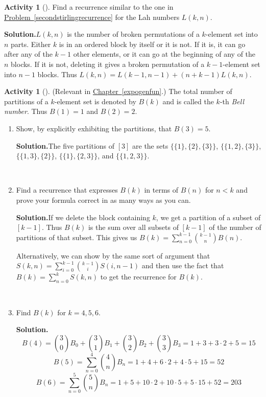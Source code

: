 \documentclass[10pt,]{book}
\theoremstyle{plain}
\theoremstyle{definition}
\newtheorem{activity}[project]{Activity}
\numberwithin{equation}{chapter}
\newcommand{\lt}{<}
\begin{document}
\begin{activity}[]\label{activity-123}
Find a recurrence similar to the one in \hyperref[secondstirlingrecurrence]{Problem~\ref{secondstirlingrecurrence}} for the Lah numbers \(L(k,n)\).%
\par\medskip\noindent%
\textbf{Solution.}\quad \(L(k,n)\) is the number of broken permutations of a \(k\)-element set into \(n\) parts. Either \(k\) is in an ordered block by itself or it is not. If it is, it can go after any of the \(k-1\) other elements, or it can go at the beginning of any of the \(n\) blocks. If it is not, deleting it gives a broken permutation of a \(k-1\)-element set into \(n-1\) blocks. Thus \(L(k,n)=L(k-1,n-1) + (n+k-1)L(k,n)\).%
\end{activity}
\begin{activity}[]\label{BellNumberIntro}
(Relevant in \hyperref[expogenfun]{Chapter~\ref{expogenfun}}.) The total number of partitions of a \(k\)-element set is denoted by \(B(k)\) and is called the \(k\)-th \emph{Bell number}. Thus \(B(1)=1\) and \(B(2) =2\).%
~\par
\begin{enumerate}[label=(\alph*)]
 \item Show, by explicitly exhibiting the partitions, that \(B(3)=5\).%
\par\medskip\noindent%
\textbf{Solution.}\quad The five partitions of \([3]\) are the sets \(\{\{1\},
\{2\},\{3\}\}\), \(\{\{1,2\},\{3\}\}\), \(\{\{1,3\},\{2\}\}\), \(\{\{1\},\{2,3\}\}\), and \(\{\{1,2,3\}\}\).%

~\par
\item Find a recurrence that expresses \(B(k)\) in terms of \(B(n)\) for \(n\lt  k\) and prove your formula correct in as many ways as you can.%
\par\medskip\noindent%
\textbf{Solution.}\quad If we delete the block containing \(k\), we get a partition of a subset of \([k-1]\). Thus \(B(k)\) is the sum over all subsets of \([k-1]\) of the number of partitions of that subset. This gives us \(B(k)= \sum_{n=0}^{k-1}\binom{k-1}{n}B(n)\).%
\par
Alternatively, we can show by the same sort of argument that \(S(k,n)=\sum_{i=0}^{k-1} \binom{k-1}{i}S(i,n-1)\) and then use the fact that \(B(k)=\sum_{n=0}^k S(k,n)\) to get the recurrence for \(B(k)\).%

~\par
\item Find \(B(k)\) for \(k=4,5,6\).%
\par\medskip\noindent%
\textbf{Solution.}\quad %
\begin{equation*}
B(4) =\binom{3}{0}B_0 +\binom{3}{1}B_1 +\binom{3}{2}B_2 +
\binom{3}{3}B_3=1 +3+3\cdot2 +5=15
\end{equation*}
%
\begin{equation*}
B(5) = \sum_{n=0}^4 \binom{4}{n}B_n = 1 +4+6\cdot2 +4\cdot5 + 15=52
\end{equation*}
%
\begin{equation*}
B(6) = \sum_{n=0}^5 \binom{5}{n}B_n =1+5 +10\cdot2 +10\cdot 5
+5\cdot 15 +52=203
\end{equation*}


\end{enumerate}
\end{activity}
\end{document}
